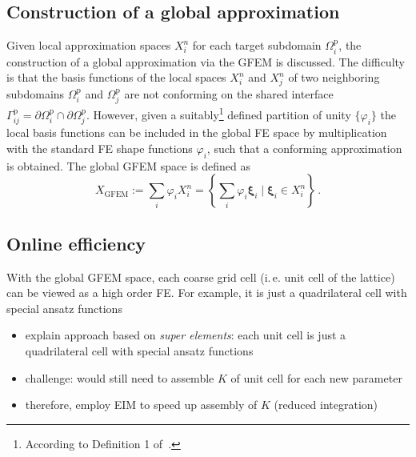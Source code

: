 \documentclass[a4paper]{eccomas_paper-2024}
\makeatletter
\newcommand{\ie}{i.\,e.\@\xspace}
\newcommand{\p}{\mathrm{p}}
\makeatother
\begin{document}
\subsection{Construction of a global approximation} %
\label{sub:Construction of a global approximation}
Given local approximation spaces $X^n_i$ for each target subdomain $\varOmega_i^{\p}$, the construction of a global approximation via the GFEM is discussed.
The difficulty is that the basis functions of the local spaces $X^n_i$ and $X^n_j$ of two neighboring subdomains $\varOmega_i^{\p}$ and $\varOmega_j^{\p}$ are not conforming on the shared interface $\varGamma^{\p}_{ij}=\partial\varOmega_i^{\p}\cap\partial\varOmega_j^{\p}$.
However, given a suitably\footnote{According to Definition 1 of~\cite{BABUSKA1997}.} defined partition of unity $\{{\varphi}_i\}$ the local basis functions can be included in the global FE space by multiplication with the standard FE shape functions ${\varphi}_i$, such that a conforming approximation is obtained.
The global GFEM space is defined as
\begin{equation}
	\label{eq:Xgfem}
	X_{\mathrm{GFEM}}:= \sum_{i} \varphi_iX^n_i = \left\lbrace\sum_i\varphi_i\bm\xi_i \;\big|\; \bm\xi_i\in X^n_i	\right\rbrace\,.
\end{equation}


\subsection{Online efficiency} %
\label{sub:Online efficiency}
With the global GFEM space, each coarse grid cell (\ie{} unit cell of the lattice) can be viewed as a high order FE.
For example, it is just a quadrilateral cell with special ansatz functions 
\begin{itemize}
    \item explain approach based on \textit{super elements}: each unit cell is just a quadrilateral cell with special ansatz functions
    \item challenge: would still need to assemble $K$ of unit cell for each new parameter
    \item therefore, employ EIM to speed up assembly of $K$ (reduced integration)
\end{itemize}
\end{document}
